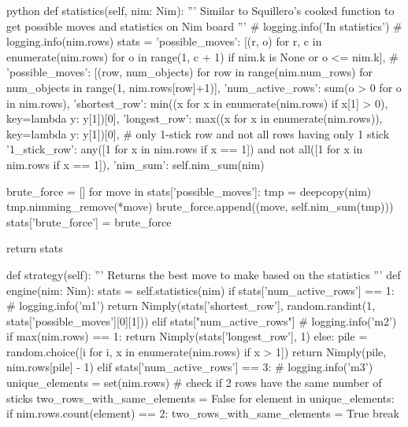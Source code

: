 \begin{mintedbox}{python}
        def statistics(self, nim: Nim):
            '''
            Similar to Squillero's cooked function to get possible moves
            and statistics on Nim board
            '''
            # logging.info('In statistics')
            # logging.info(nim.rows)
            stats = {
                'possible_moves': [(r, o) for r, c in enumerate(nim.rows) for o in range(1, c + 1) if nim.k is None or o <= nim.k],
                # 'possible_moves': [(row, num_objects) for row in range(nim.num_rows) for num_objects in range(1, nim.rows[row]+1)],
                'num_active_rows': sum(o > 0 for o in nim.rows),
                'shortest_row': min((x for x in enumerate(nim.rows) if x[1] > 0), key=lambda y: y[1])[0],
                'longest_row': max((x for x in enumerate(nim.rows)), key=lambda y: y[1])[0],
                # only 1-stick row and not all rows having only 1 stick
                '1_stick_row': any([1 for x in nim.rows if x == 1]) and not all([1 for x in nim.rows if x == 1]),
                'nim_sum': self.nim_sum(nim)
            }

            brute_force = []
            for move in stats['possible_moves']:
                tmp = deepcopy(nim)
                tmp.nimming_remove(*move)
                brute_force.append((move, self.nim_sum(tmp)))
            stats['brute_force'] = brute_force

            return stats

        def strategy(self):
            '''
            Returns the best move to make based on the statistics
            '''
            def engine(nim: Nim):
                stats = self.statistics(nim)
                if stats['num_active_rows'] == 1:
                    # logging.info('m1')
                    return Nimply(stats['shortest_row'], random.randint(1, stats['possible_moves'][0][1]))
                elif stats["num_active_rows"] %
                    # logging.info('m2')
                    if max(nim.rows) == 1:
                        return Nimply(stats['longest_row'], 1)
                    else:
                        pile = random.choice([i for i, x in enumerate(nim.rows) if x > 1])
                        return Nimply(pile, nim.rows[pile] - 1)
                elif stats['num_active_rows'] == 3:
                    # logging.info('m3')
                    unique_elements = set(nim.rows)
                    # check if 2 rows have the same number of sticks
                    two_rows_with_same_elements = False
                    for element in unique_elements:
                        if nim.rows.count(element) == 2:
                            two_rows_with_same_elements = True
                            break


\end{mintedbox}
